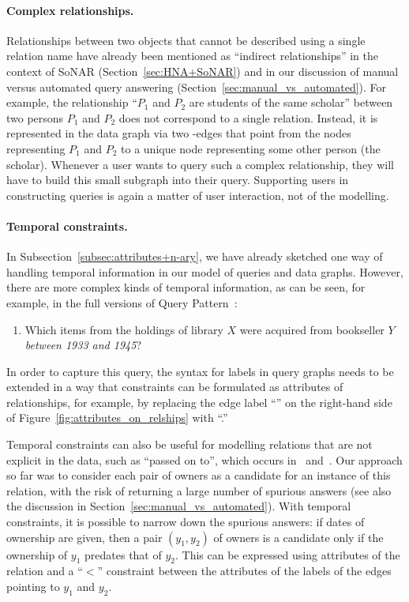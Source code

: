 \paragraph{Complex relationships.}

Relationships between two objects that cannot be described using a single relation name
have already been mentioned as \enquote{indirect relationships}
in the context of SoNAR (Section~\ref{sec:HNA+SoNAR})
and in our discussion of manual versus automated query answering (Section~\ref{sec:manual_vs_automated}).
For example, the relationship \enquote{$P_1$ and $P_2$ are students of the same scholar}
between two persons $P_1$ and $P_2$ does not correspond to a single relation.
Instead, it is represented in the data graph 
via two -edges that point from the nodes representing $P_1$ and $P_2$
to a unique node representing some other person (the scholar).
Whenever a user wants to query such a complex relationship, they will
have to build this small subgraph into their query.
Supporting users in constructing queries is again a matter of user interaction,
not of the modelling.

\paragraph{Temporal constraints.}

In Subsection~\ref{subsec:attributes+n-ary}, we have already sketched one way of handling
temporal information in our model of queries and data graphs.
However, there are more complex kinds of temporal information,
as can be seen, for example, in the full versions of Query Pattern~:
%
\begin{enumerate}
  \item[\exaquery{5}]
    Which items from the holdings of library $X$ were acquired from bookseller $Y$
    \emph{between 1933 and 1945}?
\end{enumerate}
%
In order to capture this query, the syntax for labels in query graphs needs to be extended in a way that
constraints can be formulated as attributes of relationships,
for example, 
by replacing the edge label \enquote{}
on the right-hand side of Figure~\ref{fig:attributes_on_relships}
with \enquote{.}

Temporal constraints can also be useful for modelling relations
that are not explicit in the data, such as \enquote{passed on to}, which occurs in~ and~.
Our approach so far was to consider each pair of owners as a candidate for an instance of this relation,
with the risk of returning a large number of spurious answers
(see also the discussion in Section~\ref{sec:manual_vs_automated}).
With temporal constraints, it is possible to narrow down the spurious answers:
if dates of ownership are given, then a pair $(y_1,y_2)$ of owners
is a candidate only if the ownership of $y_1$ predates that of $y_2$.
This can be expressed using attributes of the  relation
and a \enquote{$<$} constraint between the attributes of the  labels
of the edges pointing to $y_1$ and $y_2$.

